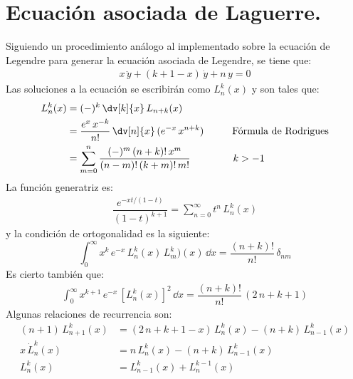 \section{Ecuación asociada de Laguerre.}
Siguiendo un procedimiento análogo al implementado sobre la ecuación de Legendre para generar la ecuación asociada de Legendre, se tiene que:
\begin{align*}
x \, \ddot{y} + (k + 1 - x) \, \dot{y} +  n \, y = 0
\end{align*}
Las soluciones a la ecuación se escribirán como $L_{n}^{k} (x)$ y son tales que:
\begin{align*}
L_{n}^{k} (x) &= (-)^{k} \, \dv[k]{x} \, L_{n+k} (x) \\
&= \dfrac{e^{x} \, x^{-k}}{n!} \, \dv[n]{x} \, (e^{-x} \, x^{n+k}) \hspace{1cm} \mbox{Fórmula de Rodrigues} \\
&= \sum_{m=0}^{n} \dfrac{(-)^{m} \, (n + k)! \, x^{m}}{(n -m )! \, (k + m)! \, m!} \hspace{1.5cm} k > -1
\end{align*}
La función generatriz es:
\begin{align*}
\dfrac{e^{-xt/(1-t)}}{(1 - t)^{k+1}} = \sum_{n=0}^{\infty} t^{n} \, L_{n}^{k} (x)
\end{align*}
y la condición de ortogonalidad es la siguiente:
\begin{equation}
\int_{0}^{\infty} x^{k} \, e^{-x} \, L_{n}^{k} (x) \, L_{m}^{k} )(x) \, \dd x = \dfrac{(n + k)!}{n!} \, \delta_{nm}
\label{eq:ecuacion_08_79}
 \end{equation}
Es cierto también que:
\begin{align*}
\int_{0}^{\infty} x^{k+1} \, e^{-x} \, [L_{n}^{k} (x)]^{2} \, \dd{x} = \dfrac{(n+k)!}{n!} \, (2 \, n +k + 1)
\end{align*}
Algunas relaciones de recurrencia son:
\begin{align*}
(n + 1) \, L_{n+1}^{k} (x) &= (2 \, n + k + 1 - x) \, L_{n}^{k} (x) - (n + k) \, L_{n-1}^{k} (x) \\[0.5em]
x \, \dot{L}_{n}^{k} (x) &= n \, L_{n}^{k} (x) - (n + k) \, L_{n-1}^{k} (x) \\[0.5em]
L_{n}^{k} (x) &= L_{n-1}^{k}(x) + L_{n}^{k-1}(x)
\end{align*}
